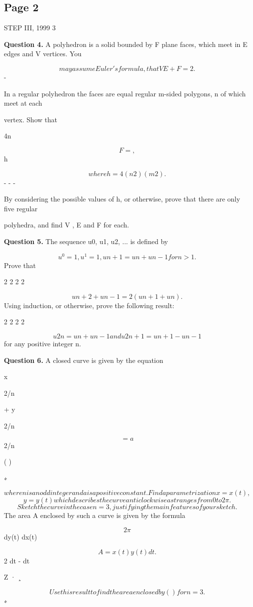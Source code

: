\documentclass[12pt]{article}
\begin{document}
\subsection*{Page 2}
\begin{flushleft}
STEP III, 1999 3\par
\bigskip\textbf{Question 4.} A polyhedron is a solid bounded by F plane faces, which meet in E edges and V vertices. You\par
\[may assume Euler's formula, that V E + F = 2.\]
-\par
In a regular polyhedron the faces are equal regular m-sided polygons, n of which meet at each\par
vertex. Show that\par
4n\par
\[F = ,\]
h\par
\[where h = 4 (n 2)(m 2).\]
- - -\par
By considering the possible values of h, or otherwise, prove that there are only five regular\par
polyhedra, and find V , E and F for each.\par
\bigskip\textbf{Question 5.} The sequence u0, u1, u2, ... is defined by\par
\[u^0 = 1, u^1 = 1, u n+1 = u n + u n-1 for n > 1 .\]
Prove that\par
2 2 2 2\par
\[u n+2 + u n-1 = 2(u n+1 + u n ) .\]
Using induction, or otherwise, prove the following result:\par
2 2 2 2\par
\[u2n = u n + u n-1 and u2n+1 = u n+1 - u n-1\]
for any positive integer n.\par
\bigskip\textbf{Question 6.} A closed curve is given by the equation\par
x\par
2/n\par
+ y\par
2/n\par
\[= a\]
2/n\par
( )\par
∗\par
\[where n is an odd integer and a is a positive constant. Find a parametrization x = x(t),\]
\[y = y(t) which describes the curve anticlockwise as t ranges from 0 to 2\pi.\]
\[Sketch the curve in the case n = 3, justifying the main features of your sketch.\]
The area A enclosed by such a curve is given by the formula\par
\[2\pi\]
dy(t) dx(t)\par
\[A = x(t) y(t) dt .\]
2 dt - dt\par
Z · ¸\par
\[Use this result to find the area enclosed by ( ) for n = 3.\]
∗\par
\end{flushleft}
\end{document}
